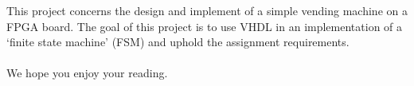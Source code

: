 This project concerns the design and implement of a simple vending machine on a FPGA board. 
The goal of this project is to use VHDL in an implementation of a `finite state machine' (FSM) and uphold the assignment requirements. 
\\  
\\ 
We hope you enjoy your reading.

